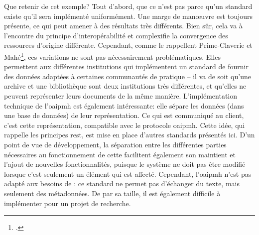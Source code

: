 Que retenir de cet exemple? Tout d'abord, que ce n'est pas parce qu'un standard existe qu'il sera implémenté uniformément. Une marge de manœuvre est toujours présente, ce qui peut amener à des résultats très différents. Bien sûr, cela va à l'encontre du principe d'interopérabilité et complexifie la convergence des ressources d'origine différente. Cependant, comme le rappellent Prime-Claverie et Mahé\footcite[p. 15-16]{prime-claverie_defi_2017}, ces variations ne sont pas nécessairement problématiques. Elles permettent aux différentes institutions qui implémentent un standard de fournir des données adaptées à certaines communautés de pratique -- il va de soit qu'une archive et une bibliothèque sont deux institutions très différentes, et qu'elles ne peuvent représenter leurs documents de la même manière. L'implémentation technique de l'\gls{oaipmh} est également intéressante: elle sépare les données (dans une base de données) de leur représentation. Ce qui est communiqué au client, c'est cette représentation, compatible avec le protocole \gls{oaipmh}. Cette idée, qui rappelle les principes \gls{rest}, est mise en place d'autres standards présentés ici. D'un point de vue de développement, la séparation entre les différentes parties nécessaires au fonctionnement de cette \api{} facilitent également son maintient et l'ajout de nouvelles fonctionnalités, puisque le système ne doit pas être modifié lorsque c'est seulement un élément qui est affecté. Cependant, l'\gls{oaipmh} n'est pas adapté aux besoins de \ktb{}: ce standard ne permet pas d'échanger du texte, mais seulement des métadonnées. De par sa taille, il est également difficile à implémenter pour un projet de recherche.


